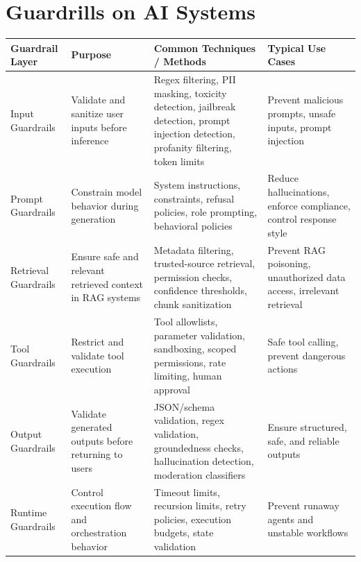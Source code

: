\documentclass[10pt,a4paper]{article}
\begin{document}
\section{Guardrills on AI Systems}

\begin{table}[H]
\centering
\small
\begin{tabular}{|p{3.2cm}|p{3.5cm}|p{5.2cm}|p{3.5cm}|}
\hline

\textbf{Guardrail Layer} &
\textbf{Purpose} &
\textbf{Common Techniques / Methods} &
\textbf{Typical Use Cases} \\

\hline

Input Guardrails &
Validate and sanitize user inputs before inference &
Regex filtering, PII masking, toxicity detection, jailbreak detection, prompt injection detection, profanity filtering, token limits &
Prevent malicious prompts, unsafe inputs, prompt injection \\

\hline

Prompt Guardrails &
Constrain model behavior during generation &
System instructions, constraints, refusal policies, role prompting, behavioral policies &
Reduce hallucinations, enforce compliance, control response style \\

\hline

Retrieval Guardrails &
Ensure safe and relevant retrieved context in RAG systems &
Metadata filtering, trusted-source retrieval, permission checks, confidence thresholds, chunk sanitization &
Prevent RAG poisoning, unauthorized data access, irrelevant retrieval \\

\hline

Tool Guardrails &
Restrict and validate tool execution &
Tool allowlists, parameter validation, sandboxing, scoped permissions, rate limiting, human approval &
Safe tool calling, prevent dangerous actions \\

\hline

Output Guardrails &
Validate generated outputs before returning to users &
JSON/schema validation, regex validation, groundedness checks, hallucination detection, moderation classifiers &
Ensure structured, safe, and reliable outputs \\

\hline

Runtime Guardrails &
Control execution flow and orchestration behavior &
Timeout limits, recursion limits, retry policies, execution budgets, state validation &
Prevent runaway agents and unstable workflows \\


\end{tabular}
\end{table}
\end{document}
